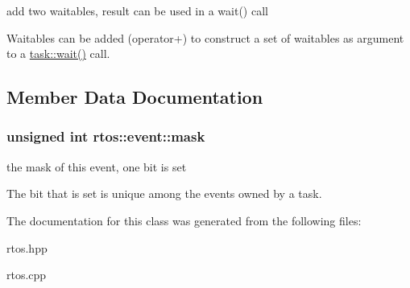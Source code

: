 add two waitables, result can be used in a wait() call 

Waitables can be added (operator+) to construct a \textquotesingle{}set of waitables\textquotesingle{} as argument to a \hyperlink{classrtos_1_1task__base_a2590ba76480cecaff66282516fbeb1bb}{task\+::wait()} call. 

\subsection{Member Data Documentation}
\subsubsection[{\texorpdfstring{mask}{mask}}]{\setlength{\rightskip}{0pt plus 5cm}unsigned int rtos\+::event\+::mask\hspace{0.3cm}{\ttfamily [protected]}}\hypertarget{classrtos_1_1event_aa6e6f66f74b4f1523e456d34dd7a1704}{}\label{classrtos_1_1event_aa6e6f66f74b4f1523e456d34dd7a1704}


the mask of this event, one bit is set 

The bit that is set is unique among the events owned by a task. 

The documentation for this class was generated from the following files\+:\begin{DoxyCompactItemize}
\item 
rtos.\+hpp\item 
rtos.\+cpp\end{DoxyCompactItemize}
